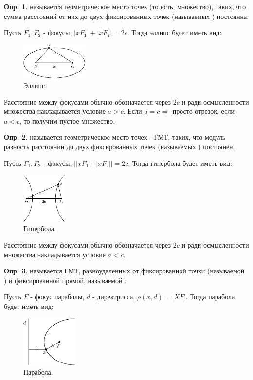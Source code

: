 \documentclass[12pt]{article}
\theoremstyle{definition}
\newtheorem{defn}{Опр:}
\begin{document}
\begin{defn}
	 называется геометрическое место точек (то есть, множество), таких, что сумма расстояний от них до двух фиксированных точек (называемых ) постоянна.
\end{defn}
Пусть $F_1, F_2$ - фокусы, $|xF_1| + |xF_2| = 2c$. Тогда эллипс будет иметь вид:
\begin{figure}[H]
	\centering
	\includegraphics[width=0.3\textwidth]{ANGL1_2.eps}
	\caption{Эллипс.}
	\label{1_2}
\end{figure}
Расстояние между фокусами обычно обозначается через $2c$ и ради осмысленности множества накладывается условие $a > c$. Если $a = c \Rightarrow$ просто отрезок, если $a < c$, то получим пустое множество.
\begin{defn}
	 называется геометрическое место точек - ГМТ, таких, что модуль разность расстояний до двух фиксированных точек (называемых ) постоянен.
\end{defn}
Пусть $F_1, F_2$ - фокусы, $||xF_1| - |xF_2|| = 2c$. Тогда гипербола будет иметь вид:
\begin{figure}[H]
	\centering
	\includegraphics[width=0.2\textwidth]{ANGL1_3.eps}
	\caption{Гипербола.}
	\label{1_3}
\end{figure}
Расстояние между фокусами обычно обозначается через $2c$ и ради осмысленности множества накладывается условие $a < c$.
\begin{defn}
	 называется ГМТ, равноудаленных от фиксированной точки (называемой ) и фиксированной прямой, называемой . 
\end{defn}
Пусть $F$ - фокус параболы, $d$ - директрисса, $\rho(x,d) = |XF|$. Тогда парабола будет иметь вид:
\begin{figure}[H]
	\centering
	\includegraphics[width=0.25\textwidth]{ANGL1_4.eps}
	\caption{Парабола.}
	\label{1_4}
\end{figure}
\end{document}

